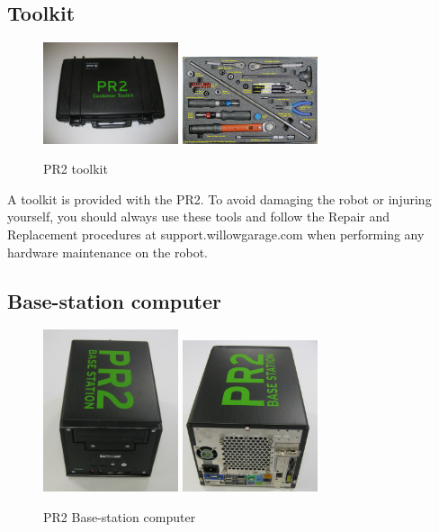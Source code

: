 \subsection{Toolkit}
\begin{figure}[h!]
\centering
\includegraphics[width=150px]{images/toolkit.png}
\includegraphics[width=150px]{images/toolkit_layout.png}
\caption{PR2 toolkit}
\label{fig:toolkit}
\end{figure}
\label{toolkit}
A toolkit is provided with the PR2.  To avoid damaging the robot or injuring yourself, you should always use these tools and follow the Repair and Replacement procedures at support.willowgarage.com when performing any hardware maintenance on the robot.


\subsection{Base-station computer}
\begin{figure}[h!]
\centering
\includegraphics[width=150px]{images/basestation.png}
\includegraphics[width=150px]{images/basestation_back.png}
\caption{PR2 Base-station computer}
\label{fig:basestation}
\end{figure}
\label{basestation}

